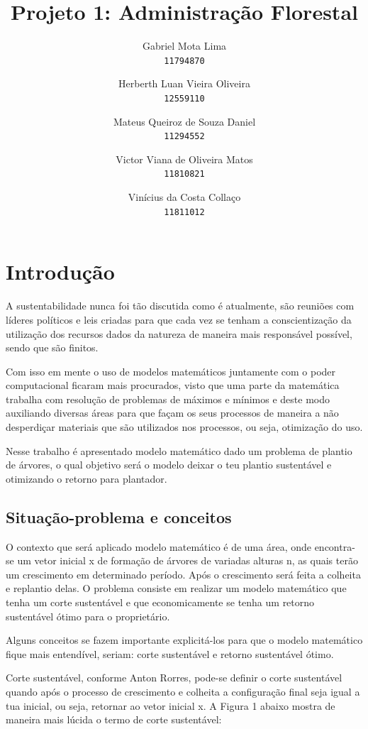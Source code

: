 \documentclass[a4paper, 12pt]{article}
\title{Projeto 1: Administração Florestal}
\author{
  Gabriel Mota Lima\\
  \texttt{11794870}
  \and
  Herberth Luan Vieira Oliveira\\
  \texttt{12559110}
  \and
  Mateus Queiroz de Souza Daniel\\
  \texttt{11294552}
  \and
  Victor Viana de Oliveira Matos\\
  \texttt{11810821}
  \and
  Vinícius da Costa Collaço\\
  \texttt{11811012}
}
\begin{document}
\maketitle

\section{Introdução}

A sustentabilidade nunca foi tão discutida como é atualmente, são reuniões com líderes políticos e leis criadas para que cada vez se tenham a conscientização da utilização dos recursos dados da natureza de maneira mais responsável possível, sendo que são finitos.

Com isso em mente o uso de modelos matemáticos juntamente com o poder computacional ficaram mais procurados, visto que uma parte da matemática trabalha com resolução de problemas de máximos e mínimos e deste modo auxiliando diversas áreas para que façam os seus processos de maneira a não desperdiçar materiais que são utilizados nos processos, ou seja, otimização do uso. 

Nesse trabalho é apresentado modelo matemático dado um problema de plantio de árvores, o qual objetivo será o modelo deixar o teu plantio sustentável e otimizando o retorno para plantador.

\subsection{Situação-problema e conceitos}
O contexto que será aplicado modelo matemático é de uma área, onde encontra-se um vetor inicial x de formação de árvores de variadas alturas n, as quais terão um crescimento em determinado período. Após o crescimento será feita a colheita e replantio delas. O problema consiste em realizar um modelo matemático que tenha um corte sustentável e que economicamente se tenha um retorno sustentável ótimo para o proprietário.

Alguns conceitos se fazem importante explicitá-los para que o modelo matemático fique mais entendível, seriam: corte sustentável e retorno sustentável ótimo.

Corte sustentável, conforme Anton Rorres, pode-se definir o corte sustentável quando após o processo de crescimento e colheita a configuração final seja igual a tua inicial, ou seja, retornar ao vetor inicial x. A Figura 1 abaixo mostra de maneira mais lúcida o termo de corte sustentável:
\end{document}
